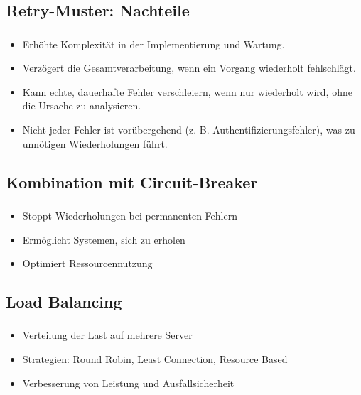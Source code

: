 \subsection{Retry-Muster: Nachteile}
\begin{frame}
    \frametitle{\insertsection}
    \framesubtitle{\insertsubsection}

    \begin{itemize}
        \item Erhöhte Komplexität in der Implementierung und Wartung.
        \item Verzögert die Gesamtverarbeitung, wenn ein Vorgang wiederholt fehlschlägt.
        \item Kann echte, dauerhafte Fehler verschleiern, wenn nur wiederholt wird, ohne die Ursache zu analysieren.
        \item Nicht jeder Fehler ist vorübergehend (z. B. Authentifizierungsfehler), was zu unnötigen Wiederholungen führt.
    \end{itemize}
\end{frame}

\subsection{\textbf{Kombination mit Circuit-Breaker}}

\begin{frame}
    \frametitle{\insertsection}
    \framesubtitle{\insertsubsection}

    \begin{itemize}
        \item Stoppt Wiederholungen bei permanenten Fehlern
        \item Ermöglicht Systemen, sich zu erholen
        \item Optimiert Ressourcennutzung
    \end{itemize}
\end{frame}

\subsection{\textbf{Load Balancing}}

\begin{frame}
    \frametitle{\insertsection}
    \framesubtitle{\insertsubsection}

    \begin{itemize}
        \item Verteilung der Last auf mehrere Server
        \item Strategien: Round Robin, Least Connection, Resource Based
        \item Verbesserung von Leistung und Ausfallsicherheit
    \end{itemize}
\end{frame}

